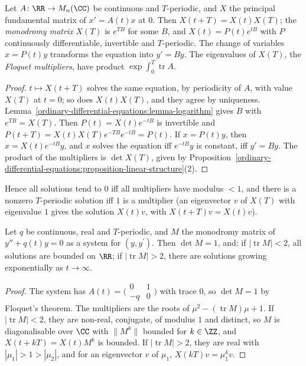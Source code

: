 \begin{theorem}[Floquet]\label{ordinary-differential-equations:theorem-floquet}
Let $A \colon \RR \to M_n(\CC)$ be continuous and $T$-periodic, and $X$ the principal fundamental matrix of $x' = A(t)x$ at $0$. Then $X(t + T) = X(t)X(T)$; the \emph{monodromy matrix} $X(T)$ is $e^{TB}$ for some $B$, and
$X(t) = P(t)e^{tB}$ with $P$ continuously differentiable, invertible and $T$-periodic. The change of variables $x = P(t)y$ transforms the equation into $y' = By$. The eigenvalues of $X(T)$, the \emph{Floquet multipliers},
have product $\exp\int_0^T\operatorname{tr}A$.
\end{theorem}

\begin{proof}
$t \mapsto X(t + T)$ solves the same equation, by periodicity of $A$, with value $X(T)$ at $t = 0$; so does $X(t)X(T)$, and they agree by uniqueness. Lemma~\ref{ordinary-differential-equations:lemma-logarithm} gives $B$ with
$e^{TB} = X(T)$. Then $P(t) = X(t)e^{-tB}$ is invertible and $P(t + T) = X(t)X(T)e^{-TB}e^{-tB} = P(t)$. If $x = P(t)y$, then $x = X(t)e^{-tB}y$, and $x$ solves the equation iff $e^{-tB}y$ is constant, iff $y' = By$. The product of
the multipliers is $\det X(T)$, given by Proposition~\ref{ordinary-differential-equations:proposition-linear-structure}(2).
\end{proof}

Hence all solutions tend to $0$ iff all multipliers have modulus $< 1$, and there is a nonzero $T$-periodic solution iff $1$ is a multiplier (an eigenvector $v$ of $X(T)$ with eigenvalue $1$ gives the solution $X(t)v$, with
$X(t + T)v = X(t)v$).

\begin{proposition}\label{ordinary-differential-equations:proposition-hill}
Let $q$ be continuous, real and $T$-periodic, and $M$ the monodromy matrix of $y'' + q(t)y = 0$ as a system for $(y, y^{\prime})$. Then $\det M = 1$, and: if $|\operatorname{tr}M| < 2$, all solutions are bounded on $\RR$; if
$|\operatorname{tr}M| > 2$, there are solutions growing exponentially as $t \to \infty$.
\end{proposition}

\begin{proof}
The system has $A(t) = \bigl(\begin{smallmatrix}0 & 1\\ -q & 0\end{smallmatrix}\bigr)$ with trace $0$, so $\det M = 1$ by Floquet's theorem. The multipliers are the roots of $\mu^2 - (\operatorname{tr}M)\mu + 1$. If
$|\operatorname{tr}M| < 2$, they are non-real, conjugate, of modulus $1$ and distinct, so $M$ is diagonalisable over $\CC$ with $\|M^k\|$ bounded for $k \in \ZZ$, and $X(t + kT) = X(t)M^k$ is bounded. If $|\operatorname{tr}M| > 2$, they are
real with $|\mu_1| > 1 > |\mu_2|$, and for an eigenvector $v$ of $\mu_1$, $X(kT)v = \mu_1^kv$.
\end{proof}

